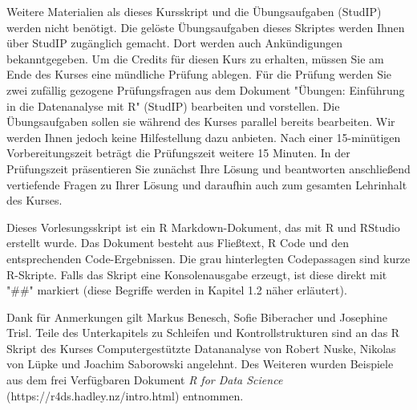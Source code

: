 \begin{titlepage}
Weitere Materialien als dieses Kursskript und die Übungsaufgaben (StudIP) werden nicht benötigt. Die gelöste Übungsaufgaben dieses Skriptes werden Ihnen über StudIP zugänglich gemacht. Dort werden auch Ankündigungen bekanntgegeben. Um die Credits für diesen Kurs zu erhalten, müssen Sie am Ende des Kurses eine mündliche Prüfung ablegen. Für die Prüfung werden Sie zwei zufällig gezogene Prüfungsfragen aus dem Dokument "Übungen: Einführung in die Datenanalyse mit R" (StudIP) bearbeiten und vorstellen. Die Übungsaufgaben sollen sie während des Kurses parallel bereits bearbeiten. Wir werden Ihnen jedoch keine Hilfestellung dazu anbieten. Nach einer 15-minütigen Vorbereitungszeit beträgt die Prüfungszeit weitere 15 Minuten. In der Prüfungszeit präsentieren Sie zunächst Ihre Lösung und beantworten anschließend vertiefende Fragen zu Ihrer Lösung und daraufhin auch zum gesamten Lehrinhalt des Kurses.

Dieses Vorlesungsskript ist ein R Markdown-Dokument, das mit R und RStudio erstellt wurde. Das Dokument besteht aus Fließtext, R Code und den entsprechenden Code-Ergebnissen. Die grau hinterlegten Codepassagen sind kurze R-Skripte. Falls das Skript eine Konsolenausgabe erzeugt, ist diese direkt mit "\#\#" markiert (diese Begriffe werden in Kapitel 1.2 näher erläutert).

Dank für Anmerkungen gilt Markus Benesch, Sofie Biberacher und Josephine Trisl. Teile des Unterkapitels zu Schleifen und Kontrollstrukturen sind an das R Skript des Kurses Computergestützte Datananalyse von Robert Nuske, Nikolas von Lüpke und Joachim Saborowski angelehnt. Des Weiteren wurden Beispiele aus dem frei Verfügbaren Dokument \textit{R for Data Science} (https://r4ds.hadley.nz/intro.html) entnommen.
\end{titlepage}

